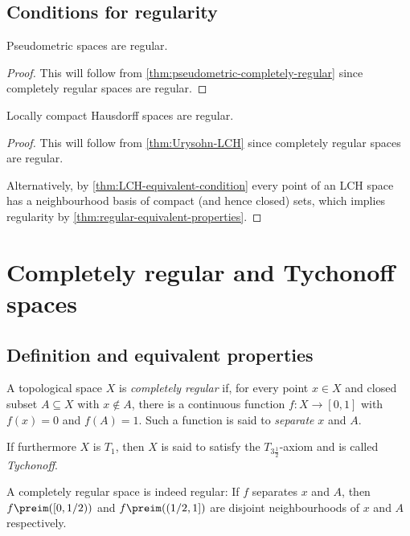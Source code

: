 \documentclass[article, a4paper, 11pt, oneside]{memoir}
\numberwithin{equation}{chapter}
\begin{document}
\section{Conditions for regularity}

\begin{corollary}
    Pseudometric spaces are regular.
\end{corollary}

\begin{proof}
    This will follow from \cref{thm:pseudometric-completely-regular} since completely regular spaces are regular.
\end{proof}


\begin{corollary}
    Locally compact Hausdorff spaces are regular.
\end{corollary}

\begin{proof}
    This will follow from \cref{thm:Urysohn-LCH} since completely regular spaces are regular.

    Alternatively, by \cref{thm:LCH-equivalent-condition} every point of an LCH space has a neighbourhood basis of compact (and hence closed) sets, which implies regularity by \cref{thm:regular-equivalent-properties}.
\end{proof}



\chapter{Completely regular and Tychonoff spaces}

\section{Definition and equivalent properties}

\begin{definition}
    A topological space $X$ is \emph{completely regular} if, for every point $x \in X$ and closed subset $A \subseteq X$ with $x \not\in A$, there is a continuous function $f \colon X \to [0,1]$ with $f(x) = 0$ and $f(A) = 1$. Such a function is said to \emph{separate} $x$ and $A$.

    If furthermore $X$ is $T_1$, then $X$ is said to satisfy the $T_{3\frac{1}{2}}$-axiom and is called \emph{Tychonoff}.
\end{definition}
%
A completely regular space is indeed regular: If $f$ separates $x$ and $A$, then $f\preim([0,1/2))$ and $f\preim((1/2,1])$ are disjoint neighbourhoods of $x$ and $A$ respectively.
\end{document}
